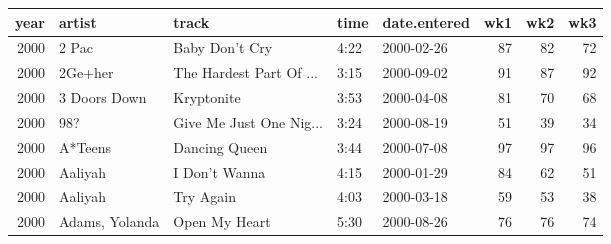 \begin{tabular}{rllllrrr}
  \toprule
 year & artist & track & time & date.entered & wk1 & wk2 & wk3 \\ 
  \midrule
  2000 & 2 Pac & Baby Don't Cry & 4:22 & 2000-02-26 &  87 &  82 &  72 \\ 
  2000 & 2Ge+her & The Hardest Part Of ... & 3:15 & 2000-09-02 &  91 &  87 &  92 \\ 
  2000 & 3 Doors Down & Kryptonite & 3:53 & 2000-04-08 &  81 &  70 &  68 \\ 
  2000 & 98? & Give Me Just One Nig... & 3:24 & 2000-08-19 &  51 &  39 &  34 \\ 
  2000 & A*Teens & Dancing Queen & 3:44 & 2000-07-08 &  97 &  97 &  96 \\ 
  2000 & Aaliyah & I Don't Wanna & 4:15 & 2000-01-29 &  84 &  62 &  51 \\ 
  2000 & Aaliyah & Try Again & 4:03 & 2000-03-18 &  59 &  53 &  38 \\ 
  2000 & Adams, Yolanda & Open My Heart & 5:30 & 2000-08-26 &  76 &  76 &  74 \\ 
   \bottomrule
\end{tabular}
